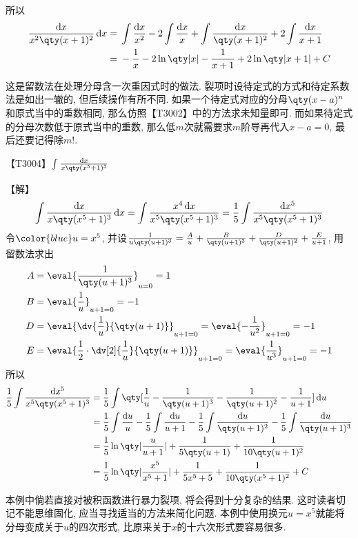 \documentclass{ctexbook}
\newcommand*{\dif}{\mathop{}\!\mathrm{d}}
\begin{document}
{所以
\begin{align*}
\frac{\dif{x}}{x^{2}\qty(x+1)^{2}}\dif{x}={}&\int\frac{\dif{x}}{x^{2}}-2\int\frac{\dif{x}}{x}+\int\frac{\dif{x}}{\qty(x+1)^{2}}+2\int\frac{\dif{x}}{x+1}\\
={}&-\frac{1}{x}-2\ln\qty|x|-\frac{1}{x+1}+2\ln\qty|x+1|+C
\end{align*}\par
{\kaishu 这是留数法在处理分母含一次重因式时的做法. 裂项时设待定式的方式和待定系数法是如出一辙的, 但后续操作有所不同. 如果一个待定式对应的分母$\qty(x-a)^{n}$和原式当中的重数相同, 那么仿照{\color{red}【T3002】}中的方法求未知量即可. 
而如果待定式的分母次数低于原式当中的重数, 那么低$m$次就需要求$m$阶导再代入$x-a=0$, 最后还要记得除$m!$. \par}
{\color{red}【T3004】}$\int\frac{\dif{x}}{x\qty(x^{5}+1)^{3}}$\par
【解】
\begin{align*}
\int\frac{\dif{x}}{x\qty(x^{5}+1)^{3}}\dif{x}=\int\frac{x^{4}\dif{x}}{x^{5}\qty(x^{5}+1)^{3}}=\frac{1}{5}\int\frac{\dif{x^{5}}}{x^{5}\qty(x^{5}+1)^{3}}
\end{align*}
令$\color{blue}u=x^{5}$, 并设$\frac{1}{u\qty(u+1)^{3}}=\frac{A}{u}+\frac{B}{\qty(u+1)^{3}}+\frac{D}{\qty(u+1)^{2}}+\frac{E}{u+1}$, 用留数法求出
\begin{align*}
A={}&\eval{\frac{1}{\qty(u+1)^{3}}}_{u=0}=1\\
B={}&\eval{\frac{1}{u}}_{u+1=0}=-1\\
D={}&\eval{\dv{\frac{1}{u}}{\qty(u+1)}}_{u+1=0}=\eval{-\frac{1}{u^{2}}}_{u+1=0}=-1\\
E={}&\eval{\frac{1}{2}\cdot\dv[2]{\frac{1}{u}}{\qty(u+1)}}_{u+1=0}=\eval{\frac{1}{u^{3}}}_{u+1=0}=-1
\end{align*}
所以
\begin{align*}
\frac{1}{5}\int\frac{\dif{x^{5}}}{x^{5}\qty(x^{5}+1)^{3}}={}&\frac{1}{5}\int\qty[\frac{1}{u}-\frac{1}{\qty(u+1)^{3}}-\frac{1}{\qty(u+1)^{2}}-\frac{1}{u+1}]\dif{u}\\
={}&\frac{1}{5}\int\frac{\dif{u}}{u}-\frac{1}{5}\int\frac{\dif{u}}{u+1}-\frac{1}{5}\int\frac{\dif{u}}{\qty(u+1)^{2}}-\frac{1}{5}\int\frac{\dif{u}}{\qty(u+1)^{3}}\\
={}&\frac{1}{5}\ln\qty|\frac{u}{u+1}|+\frac{1}{5\qty(u+1)}+\frac{1}{10\qty(u+1)^{2}}\\
={}&\frac{1}{5}\ln\qty|\frac{x^{5}}{x^{5}+1}|+\frac{1}{5x^{5}+5}+\frac{1}{10\qty(x^{5}+1)^{2}}+C
\end{align*}\par
{\kaishu 本例中倘若直接对被积函数进行暴力裂项, 将会得到十分复杂的结果. 这时读者切记不能思维固化, 应当寻找适当的方法来简化问题. 本例中使用换元$u=x^{5}$就能将分母变成关于$u$的四次形式, 比原来关于$x$的十六次形式要容易很多. \par
}}
\end{document}
